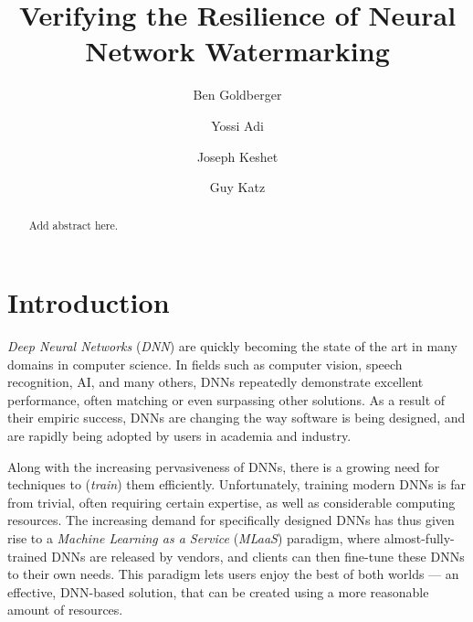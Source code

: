 \documentclass{easychair}
\newcommand{\guy}[1]{\marginpar{\textcolor{orange}{Guy: #1}}}
\begin{document}
\title{Verifying the Resilience of Neural Network Watermarking}
\author{
Ben Goldberger \and
Yossi Adi \and
Joseph Keshet \and
Guy Katz
}

\maketitle


\begin{abstract}
   Add abstract here.
 \end{abstract}

\section{Introduction}
\label{sec:introduction}

\guy{Should we make the title more general? E.g., something like
  ``Minimal Modifications of Deep Neural Networks using Verification''}


\emph{Deep Neural Networks} (\emph{DNN}) are quickly becoming the
state of the art in many domains in computer science.  In fields such
as computer vision, speech recognition, AI, and many others, DNNs
repeatedly demonstrate excellent performance, often matching or even
surpassing other solutions.  As a result of their empiric success,
DNNs are changing the way software is being designed, and are rapidly
being adopted by users in academia and industry.

Along with the increasing pervasiveness of DNNs, there is a growing
need for techniques to (\emph{train}) them efficiently. Unfortunately,
training modern DNNs is far from trivial, often requiring certain
expertise, as well as considerable computing resources. The increasing
demand for specifically designed DNNs has thus given rise to a
\emph{Machine Learning as a Service} (\emph{MLaaS}) paradigm, where
almost-fully-trained DNNs are released by vendors, and clients can
then fine-tune these DNNs to their own needs. This paradigm lets users
enjoy the best of both worlds --- an effective, DNN-based solution,
that can be created using a more reasonable amount of resources.
\end{document}
